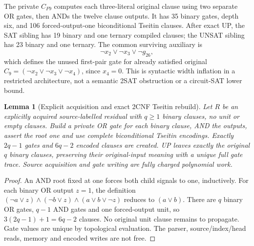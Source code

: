 \documentclass[11pt]{article}
\newtheorem{lemma}{Lemma}
\begin{document}
The private $C_{F9}$ computes each three-literal original clause
using two separate OR gates, then ANDs the twelve clause outputs.
It has 35 binary gates, depth six, and 106 forced-output-one
biconditional Tseitin clauses. After exact UP, the SAT sibling
has 19 binary and one ternary compiled clauses; the UNSAT sibling
has 23 binary and one ternary. The common surviving auxiliary is
\[
\neg x_2\vee\neg x_3\vee\neg g_{26},
\]
which defines the unused first-pair gate for already satisfied original
$C_9=(\neg x_2\vee\neg x_3\vee\neg x_4)$, since $x_4=0$.
This is syntactic width inflation in a restricted architecture,
not a semantic 2SAT obstruction or a circuit-SAT lower bound.

\begin{lemma}[Explicit acquisition and exact 2CNF Tseitin rebuild]
Let $R$ be an explicitly acquired source-labelled residual with
$q\ge1$ binary clauses, no unit or empty clauses.
Build a private OR gate for each binary clause, AND the outputs,
assert the root one and use complete biconditional Tseitin encodings.
Exactly $2q-1$ gates and $6q-2$ encoded clauses are created.
UP leaves exactly the original $q$ binary clauses, preserving
their original-input meaning with a unique full gate trace.
Source acquisition and gate writing are fully charged polynomial work.
\end{lemma}
\begin{proof}
An AND root fixed at one forces both child signals to one, inductively.
For each binary OR output $z=1$, the definition
$(\neg a\vee z)\wedge(\neg b\vee z)
\wedge(a\vee b\vee\neg z)$ reduces to $(a\vee b)$.
There are $q$ binary OR gates, $q-1$ AND gates and one
forced-output unit, so $3(2q-1)+1=6q-2$ clauses.
No original unit clause remains to propagate. Gate values
are unique by topological evaluation. The parser,
source/index/head reads, memory and encoded writes are not free.
\end{proof}
\end{document}
